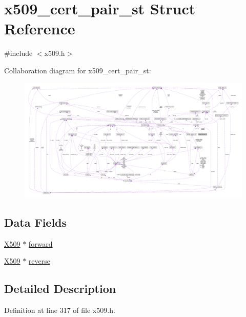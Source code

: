\hypertarget{structx509__cert__pair__st}{}\section{x509\+\_\+cert\+\_\+pair\+\_\+st Struct Reference}
\label{structx509__cert__pair__st}


{\ttfamily \#include $<$x509.\+h$>$}



Collaboration diagram for x509\+\_\+cert\+\_\+pair\+\_\+st\+:\nopagebreak
\begin{figure}[H]
\begin{center}
\leavevmode
\includegraphics[width=350pt]{structx509__cert__pair__st__coll__graph}
\end{center}
\end{figure}
\subsection*{Data Fields}
\begin{DoxyCompactItemize}
\item 
\hyperlink{crypto_2ossl__typ_8h_a4f666bde6518f95deb3050c54b408416}{X509} $\ast$ \hyperlink{structx509__cert__pair__st_add83901690509d583e405c3f45ec0a0b}{forward}
\item 
\hyperlink{crypto_2ossl__typ_8h_a4f666bde6518f95deb3050c54b408416}{X509} $\ast$ \hyperlink{structx509__cert__pair__st_a62c84d90f536d005bb08d1a1d439a180}{reverse}
\end{DoxyCompactItemize}


\subsection{Detailed Description}


Definition at line 317 of file x509.\+h.



